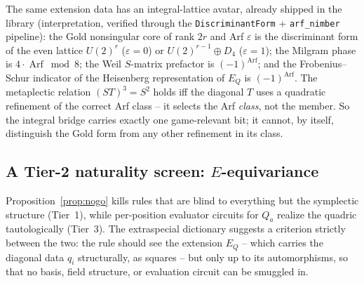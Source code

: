 \documentclass[11pt]{article}
\theoremstyle{plain}
\theoremstyle{definition}
\newcommand{\Arf}{\operatorname{Arf}}
\begin{document}
The same extension data has an integral-lattice avatar, already shipped in
the library (interpretation, verified through the
\texttt{DiscriminantForm} + \texttt{arf\_nimber} pipeline): the Gold
nonsingular core of rank $2r$ and Arf $\varepsilon$ is the discriminant form
of the even lattice $U(2)^{r}$ ($\varepsilon=0$) or
$U(2)^{r-1}\oplus D_4$ ($\varepsilon=1$); the Milgram phase is
$4\cdot\Arf\bmod 8$; the Weil $S$-matrix prefactor is $(-1)^{\Arf}$; and the
Frobenius--Schur indicator of the Heisenberg representation of $E_Q$ is
$(-1)^{\Arf}$. The metaplectic relation $(ST)^3=S^2$ holds iff the diagonal
$T$ uses a quadratic refinement of the correct Arf class -- it selects the
Arf \emph{class}, not the member. So the integral bridge carries exactly one
game-relevant bit; it cannot, by itself, distinguish the Gold form from any
other refinement in its class.

\subsection{A Tier-2 naturality screen: $E$-equivariance}

Proposition~\ref{prop:nogo} kills rules that are blind to everything but
the symplectic structure (Tier~1), while per-position evaluator circuits
for $Q_a$ realize the quadric tautologically (Tier~3). The extraspecial
dictionary suggests a criterion strictly between the two: the rule should
see the extension $E_Q$ -- which carries the diagonal data $q_i$
structurally, as squares -- but only up to its automorphisms, so that no
basis, field structure, or evaluation circuit can be smuggled in.
\end{document}

